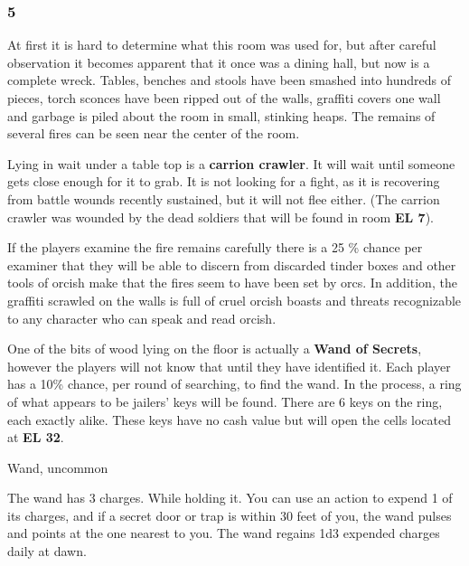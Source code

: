 \documentclass[palace_of_the_silver_princess]{subfiles}
\begin{document}
\subsubsection{5}

\begin{quotebox}
    At first it is hard to determine what this room was used for, but
    after careful observation it becomes apparent that it once was a
    dining hall, but now is a complete wreck. Tables, benches and stools
    have been smashed into hundreds of pieces, torch sconces have been
    ripped out of the walls, graffiti covers one wall and garbage is
    piled about the room in small, stinking heaps. The remains of
    several fires can be seen near the center of the room.
\end{quotebox}

Lying in wait under a table top is a \textbf{carrion crawler}.  It will
wait until someone gets close enough for it to grab. It is not looking
for a fight, as it is recovering from battle wounds recently sustained,
but it will not flee either. (The carrion crawler was wounded by the
dead soldiers that will be found in room \textbf{EL 7}).

If the players examine the fire remains carefully there is a 25 \%
chance per examiner that they will be able to discern from discarded
tinder boxes and other tools of orcish make that the fires seem to have
been set by orcs. In addition, the graffiti scrawled on the walls is
full of cruel orcish boasts and threats recognizable to any character
who can speak and read orcish.

One of the bits of wood lying on the floor is actually a \textbf{Wand of
Secrets}, however the players will not know that until they have
identified it.  Each player has a 10\% chance, per round of searching,
to find the wand. In the process, a ring of what appears to be jailers’
keys will be found. There are 6 keys on the ring, each exactly alike.
These keys have no cash value but will open the cells located at
\textbf{EL 32}.

{Wand, uncommon}

The wand has 3 charges. While holding it. You can use an action to
expend 1 of its charges, and if a secret door or trap is within 30 feet
of you, the wand pulses and points at the one nearest to you. The wand
regains 1d3 expended charges daily at dawn.
\end{document}
